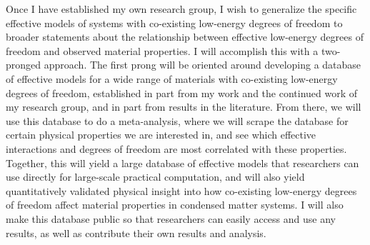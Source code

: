 \documentclass{article}
\begin{document}
Once I have established my own research group, I wish to generalize the specific effective models of systems with co-existing low-energy degrees of freedom to broader statements about the relationship between effective low-energy degrees of freedom and observed material properties.
I will accomplish this with a two-pronged approach.
The first prong will be oriented around developing a database of effective models for a wide range of materials with co-existing low-energy degrees of freedom, established in part from my work and the continued work of my research group, and in part from results in the literature.
From there, we will use this database to do a meta-analysis, where we will scrape the database for certain physical properties we are interested in, and see which effective interactions and degrees of freedom are most correlated with these properties.
Together, this will yield a large database of effective models that researchers can use directly for large-scale practical computation, and will also yield quantitatively validated physical insight into how co-existing low-energy degrees of freedom affect material properties in condensed matter systems. 
I will also make this database public so that researchers can easily access and use any results, as well as contribute their own results and analysis.
\end{document}
